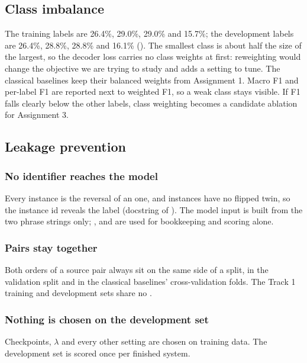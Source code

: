 \subsection{Class imbalance}
\label{sec:protocol-imbalance}

The training labels are \EQ{} 26.4\%, \FW{} 29.0\%, \BW{} 29.0\% and \NO{} 15.7\%; the development labels are 26.4\%, 28.8\%, 28.8\% and 16.1\% (). The smallest class is about half the size of the largest, so the decoder loss carries no class weights at first: reweighting would change the objective we are trying to study and adds a setting to tune. The classical baselines keep their balanced weights from Assignment 1. Macro F1 and per-label F1 are reported next to weighted F1, so a weak \NO{} class stays visible. If \NO{} F1 falls clearly below the other labels, class weighting becomes a candidate ablation for Assignment 3.

\subsection{Leakage prevention}
\label{sec:protocol-leakage}

\subsubsection*{No identifier reaches the model}
Every  instance is the reversal of an  one, and \NO{} instances have no flipped twin, so the instance id reveals the label (docstring of ). The model input is built from the two phrase strings only; ,  and  are used for bookkeeping and scoring alone.

\subsubsection*{Pairs stay together}
Both orders of a source pair always sit on the same side of a split, in the validation split and in the classical baselines' cross-validation folds. The Track 1 training and development sets share no .

\subsubsection*{Nothing is chosen on the development set}
Checkpoints, $\lambda$ and every other setting are chosen on training data. The development set is scored once per finished system.


